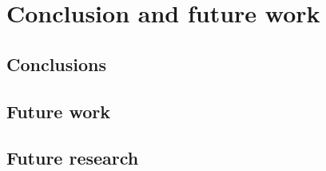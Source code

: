 
\chapter{Conclusion and future work} %

\label{Chapter9} %


\section{Conclusions}


\section{Future work}


\section{Future research}

